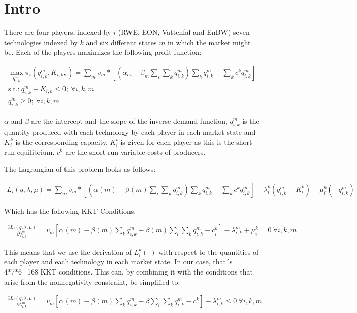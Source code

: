 \documentclass[a4paper,12pt]{article}
\theoremstyle{remark}
\begin{document}
  \section{Intro}

There are four players, indexed by $i$ (RWE, EON, Vattenfal and EnBW) seven technologies indexed by $k$ and six different states $m$ in which the market might be. Each of the players maximizes the following profit function:

\begin{gather}
	\max_{q_{i,k}^m} \pi_i(q_{i,k}^m,K_{i,k},)= \sum_m v_m * \left[(\alpha_m-\beta_m\sum_i \sum_k q_{i,k}^m ) \sum_k q_{i,k}^m - \sum_k c^k q_{i,k}^m \right] \\
			\text{s.t.:} \  q_{i,k}^m-K_{i,k} \leq 0;\  \forall i,k,m \\  \nonumber
 										  q_{i,k}^m	\geq 0; \ \forall i,k,m   \nonumber
\end{gather}

$\alpha$ and $\beta$ are the intercept and the slope of the inverse demand function, $q_{i,k}^m$ is the quantity produced with each technology by each player in each market state and $K_i^k$ is the corresponding capacity. $K_i^t$ is given for each player as this is the short run equilibrium. $c^k$ are the short run variable costs of producers.

The Lagrangian of this problem looks as follows:

\begin{gather}
	L_i(q,\lambda,\mu)= \sum_m v_m * \left[ (\alpha(m)-\beta(m)\sum_i \sum_k q_{i,k}^m ) \sum_k q_{i,k}^m - \sum_k c^k q_{i,k}^m \right] - \lambda_i^k (q_{i,k}^m - K_i^k)-\mu_i^k(-q_{i,k}^m)
\end{gather}

Which has the following KKT Conditions. 

\begin{gather}
\frac{\partial L_i(q,\lambda,\mu)}{\partial q_{i,k}^m}	= v_m\left[ \alpha(m) - \beta(m) \sum_k q_{i,k}^m - \beta(m)\sum_i \sum_k q_{i,k}^m - c_i^k \right] - \lambda_{i,k}^m + \mu_i^k = 0 \ \forall i,k,m
\end{gather}

This means that we use the derivation of $L_i^k(\cdot)$ with respect to the quantities of each player and each technology in each market state. In our case, that´s 4*7*6=168 KKT conditions. This can, by combining it with the conditions that arise from the nonnegativity constraint, be simplified to:

\begin{gather}
\frac{\partial L_i(q,\lambda,\mu)}{\partial \lambda_{i,k}^m}	= v_m \left[ \alpha(m) - \beta(m) \sum_k q_{i,k}^m - \beta\sum_i \sum_k q_{i,k}^m - c^k \right] - \lambda_{i,k}^m \leq 0 \ \forall i,k,m
\end{gather}
\end{document}
